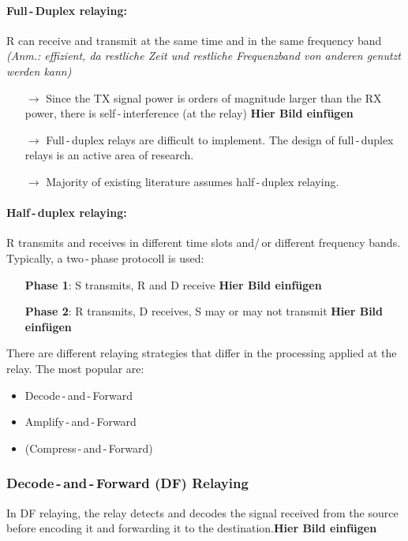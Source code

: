\documentclass[a4paper, 10pt]{article}
\begin{document}
\paragraph{Full\,-\,Duplex relaying:} 
R can receive and transmit at the same time and in the same frequency band \textit{(Anm.: effizient, da restliche Zeit und restliche Frequenzband von anderen genutzt werden kann)}
\begin{itemize}
	\item[$\rightarrow$] Since the TX signal power is orders of magnitude larger than the RX power, there is self\,-\,interference (at the relay) \textbf{Hier Bild einf\"ugen}
	\item[$\rightarrow$] Full\,-\,duplex relays are difficult to implement. The design of full\,-\,duplex relays is an active area of research.
	\item[$\rightarrow$] Majority of existing literature assumes half\,-\,duplex relaying.
\end{itemize}
\paragraph{Half\,-\,duplex relaying:} 
R transmits and receives in different time slots and/\,or different frequency bands. Typically, a two\,-\,phase protocoll is used:
\begin{itemize}
	\item[] \textbf{Phase 1}: S transmits, R and D receive \textbf{Hier Bild einf\"ugen}
	\item[] \textbf{Phase 2}: R transmits, D receives, S may or may not transmit \textbf{Hier Bild einf\"ugen}
\end{itemize}
There are different relaying strategies that differ in the processing applied at the relay. The most popular are:
\begin{itemize}
	\item Decode\,-\,and\,-\,Forward
	\item Amplify\,-\,and\,-\,Forward
	\item (Compress\,-\,and\,-\,Forward)
\end{itemize}

\subsubsection{Decode\,-\,and\,-\,Forward (DF) Relaying}
In DF relaying, the relay detects and decodes the signal received from the source before encoding it and  forwarding it to the destination.\textbf{Hier Bild einf\"ugen}
\end{document}
